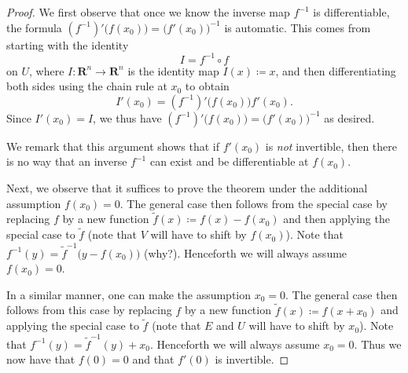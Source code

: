 \begin{proof}
    We first observe that once we know the inverse map \(f^{-1}\) is differentiable, the formula \((f^{-1})' \big(f(x_0)\big) = \big(f'(x_0)\big)^{-1}\) is automatic.
    This comes from starting with the identity
    \[
        I = f^{-1} \circ f
    \]
    on \(U\), where \(I : \mathbf{R}^n \to \mathbf{R}^n\) is the identity map \(I(x) \coloneqq x\), and then differentiating both sides using the chain rule at \(x_0\) to obtain
    \[
        I'(x_0) = (f^{-1})' \big(f(x_0)\big) f'(x_0).
    \]
    Since \(I'(x_0) = I\), we thus have \((f^{-1})' \big(f(x_0)\big) = \big(f'(x_0)\big)^{-1}\) as desired.

    We remark that this argument shows that if \(f'(x_0)\) is \emph{not} invertible, then there is no way that an inverse \(f^{-1}\) can exist and be differentiable at \(f(x_0)\).

    Next, we observe that it suffices to prove the theorem under the additional assumption \(f(x_0) = 0\).
    The general case then follows from the special case by replacing \(f\) by a new function \(\tilde{f}(x) \coloneqq f(x) - f(x_0)\) and then applying the special case to \(\tilde{f}\)
    (note that \(V\) will have to shift by \(f(x_0)\)).
    Note that \(f^{-1}(y) = \tilde{f}^{-1} \big(y - f(x_0)\big)\) (why?).
    Henceforth we will always assume \(f(x_0) = 0\).

    In a similar manner, one can make the assumption \(x_0 = 0\).
    The general case then follows from this case by replacing \(f\) by a new function
    \(\tilde{f}(x) \coloneqq f(x + x_0)\) and applying the special case to \(\tilde{f}\)
    (note that \(E\) and \(U\) will have to shift by \(x_0\)).
    Note that \(f^{-1}(y) = \tilde{f}^{-1} (y) + x_0\).
    Henceforth we will always assume \(x_0 = 0\).
    Thus we now have that \(f(0) = 0\) and that \(f'(0)\) is invertible.


\end{proof}
